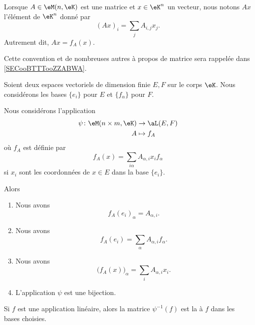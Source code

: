 \begin{normaltext}
	Lorsque \( A\in \eM(n,\eK)\) est une matrice et \( x\in \eK^n\) un vecteur, nous notons \( Ax\) l'élément de \( \eK^n\) donné par
	\begin{equation}        \label{EQooQFVTooMFfzol}
		(Ax)_i=\sum_jA_{i,j}x_j.
	\end{equation}
	Autrement dit, \( Ax=f_A(x)\).

	Cette convention et de nombreuses autres à propos de matrice sera rappelée dans \ref{SECooBTTTooZZABWA}.
\end{normaltext}

\begin{propositionDef}      \label{PROPooGXDBooHfKRrv}
	Soient deux espaces vectoriels de dimension finie \( E,F\) sur le corps \( \eK\). Nous considérons les bases \( \{ e_i \}\) pour \( E\) et \( \{ f_{\alpha} \}\) pour \( F\).

	Nous considérons l'application
	\begin{equation}
		\begin{aligned}
			\psi\colon \eM(n\times m, \eK) & \to \aL(E,F) \\
			A                              & \mapsto f_A
		\end{aligned}
	\end{equation}
	où \( f_A\) est définie par
	\begin{equation}        \label{EQooZKEKooNYjvhP}
		f_A(x)=\sum_{i\alpha}A_{\alpha, i}x_if_{\alpha}
	\end{equation}
	si \( x_i\) sont les coordonnées de \( x\in E\) dans la base \( \{ e_i \}\).

	Alors
	\begin{enumerate}
		\item       \label{ITEMooKZYYooZPTkpq}
		      Nous avons
		      \begin{equation}
			      f_A(e_i)_{\alpha}=A_{\alpha, i}.
		      \end{equation}
		\item       \label{ITEMooANXFooGIuxUR}
		      Nous avons
		      \begin{equation}          \label{EQooOKOJooYgteNP}
			      f_A(e_i)=\sum_{\alpha}A_{\alpha, i}f_{\alpha}.
		      \end{equation}
		\item       \label{ITEMooXLLLooKfigfB}
		      Nous avons
		      \begin{equation}          \label{EQooAXRJooUwHbjB}
			      \big( f_A(x) \big)_{\alpha}=\sum_{i}A_{\alpha, i}x_i.
		      \end{equation}
		\item       \label{ITEMooHSMLooRJZref}
		      L'application \( \psi\) est une bijection.
	\end{enumerate}
	Si \( f\) est une application linéaire, alors la matrice \( \psi^{-1}(f)\) est la  à \( f\) dans les bases choisies.
\end{propositionDef}


